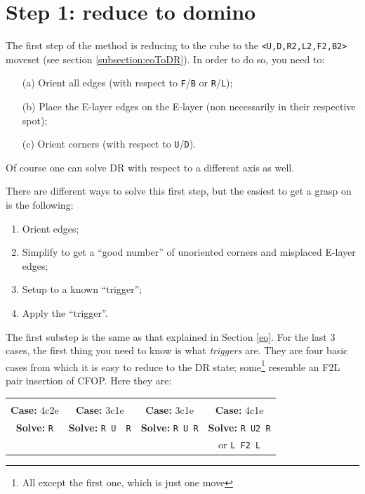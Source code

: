 \documentclass[11pt,a4paper]{book}
\newcommand{\p}{\textquotesingle}
\newcommand{\m}{\texttt}
\newcommand{\ps}{\p\,\,}
\begin{document}
\section{Step 1: reduce to domino}

The first step of the method is reducing to the cube to the \m{<U,D,R2,L2,F2,B2>} moveset (see section \ref{subsection:eoToDR}). In order to do so, you need to:
\begin{enumerate}
\item[(a)] Orient all edges (with respect to \m{F}/\m{B} or \m{R}/\m{L});
\item[(b)] Place the E-layer edges on the E-layer (non necessarily in their respective spot);
\item[(c)] Orient corners (with respect to \m{U}/\m{D}).
\end{enumerate}

Of course one can solve DR with respect to a different axis as well.

There are different ways to solve this first step, but the easiest to get a grasp on is the following:
\begin{enumerate}
\item Orient edges;
\item Simplify to get a ``good number'' of unoriented corners and misplaced E-layer edges;
\item Setup to a known ``trigger'';
\item Apply the ``trigger''.
\end{enumerate}

The first substep is the same as that explained in Section \ref{eo}. For the last 3 cases, the first thing you need to know is what \emph{triggers} are. They are four basic cases from which it is easy to reduce to the DR state; some\footnote{All except the first one, which is just one move} resemble an F2L pair insertion of CFOP. Here they are:

\begin{tabular}{cccc}
 & 
& & \\
\textbf{Case:} 4c2e & \textbf{Case:} 3c1e & \textbf{Case:} 3c1e & \textbf{Case:} 4c1e\\
\textbf{Solve:} \m{R} & \textbf{Solve:} \m{R U\ps R\p} & \textbf{Solve:} \m{R U R\p} & \textbf{Solve:} \m{R U2 R\p} \\ & & & or \m{L F2 L\p}
\end{tabular}
\end{document}
